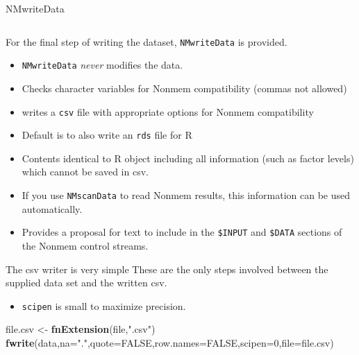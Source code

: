\documentclass[
  8pt,
  ignorenonframetext,
  aspectratio=169]{beamer}
\newenvironment{Shaded}{\begin{snugshade}}{\end{snugshade}}
\newcommand{\DataTypeTok}[1]{\textcolor[rgb]{0.13,0.29,0.53}{#1}}
\newcommand{\DecValTok}[1]{\textcolor[rgb]{0.00,0.00,0.81}{#1}}
\newcommand{\KeywordTok}[1]{\textcolor[rgb]{0.13,0.29,0.53}{\textbf{#1}}}
\newcommand{\NormalTok}[1]{#1}
\newcommand{\OtherTok}[1]{\textcolor[rgb]{0.56,0.35,0.01}{#1}}
\newcommand{\StringTok}[1]{\textcolor[rgb]{0.31,0.60,0.02}{#1}}
\providecommand{\tightlist}{%
  \setlength{\itemsep}{0pt}\setlength{\parskip}{0pt}}
\begin{document}
\begin{frame}[fragile]{NMwriteData}
\protect\hypertarget{nmwritedata}{}
\begin{columns}[T]
\begin{column}{0.48\textwidth}
For the final step of writing the dataset, \texttt{NMwriteData} is
provided.

\begin{itemize}
\item
  \texttt{NMwriteData} \emph{never} modifies the data.
\item
  Checks character variables for Nonmem compatibility (commas not
  allowed)
\item
  writes a \texttt{csv} file with appropriate options for Nonmem
  compatibility
\item
  Default is to also write an \texttt{rds} file for R
\item
  Contents identical to R object including all information (such as
  factor levels) which cannot be saved in csv.
\item
  If you use \texttt{NMscanData} to read Nonmem results, this
  information can be used automatically.
\item
  Provides a proposal for text to include in the \texttt{\$INPUT} and
  \texttt{\$DATA} sections of the Nonmem control streams.
\end{itemize}

\begin{block}{The csv writer is very simple}
\protect\hypertarget{the-csv-writer-is-very-simple}{}
These are the only steps involved between the supplied data set and the
written csv.

\begin{itemize}
\tightlist
\item
  \texttt{scipen} is small to maximize precision.
\end{itemize}

\footnotesize

\begin{Shaded}
\begin{Highlighting}[]
\NormalTok{file.csv \textless{}{-}}\StringTok{ }\KeywordTok{fnExtension}\NormalTok{(file,}\StringTok{".csv"}\NormalTok{)}
\KeywordTok{fwrite}\NormalTok{(data,}\DataTypeTok{na=}\StringTok{"."}\NormalTok{,}\DataTypeTok{quote=}\OtherTok{FALSE}\NormalTok{,}\DataTypeTok{row.names=}\OtherTok{FALSE}\NormalTok{,}\DataTypeTok{scipen=}\DecValTok{0}\NormalTok{,}\DataTypeTok{file=}\NormalTok{file.csv)}
\end{Highlighting}
\end{Shaded}


\end{block}
\end{column}
\end{columns}
\end{frame}
\end{document}
